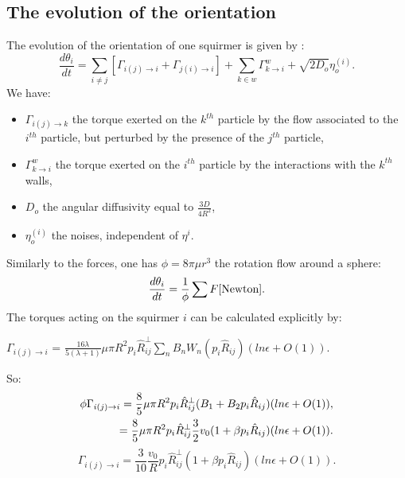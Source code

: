 \documentclass{article}
\begin{document}
\subsection{The evolution of the orientation}
The evolution of the orientation of one squirmer is given by : 
$$
\boxed{\frac{d \theta_i}{dt} = \sum\limits_{i\ne j} \left[\Gamma_{i(j)\rightarrow i} + \Gamma_{j(i)\rightarrow i}\right] + \sum\limits_{k\in w} \Gamma_{k\rightarrow i}^w + \sqrt{2D_o} \eta_o^{(i)}}.
$$
We have:
\begin{itemize}
    \item $\Gamma_{i(j)\rightarrow k}$ the torque exerted on the $k^{th}$ particle by the flow associated to the $i^{th}$ particle, but perturbed by the presence of the $j^{th}$ particle,
    \item $\Gamma_{k\rightarrow i}^w$ the torque exerted on the $i^{th}$ particle by the interactions with the $k^{th}$ walls,
    \item $D_o$ the angular diffusivity equal to $\frac{3D}{4R^2}$,
    \item $\eta_o^{(i)}$ the noises, independent of $\eta^{i}$.
\end{itemize}
\vspace{0.5cm}
Similarly to the forces, one has $\phi = 8\pi\mu r^3$ the rotation flow around a sphere\cite{Stokes}:
$$\frac{d \theta_i}{dt} = \frac{1}{\phi}\sum F\cite{Newton}.$$
The torques acting on the squirmer $i$ can be calculated explicitly by\cite{Brumley}:
\begin{center}
    $\Gamma_{i(j)\rightarrow i}$ = $\frac{16 \lambda}{5(\lambda +1)} \mu \pi R^2 p_i\hat{R}_{ij}^{\perp}\sum_{n} B_n W_n(p_i\hat{R}_{ij}) (ln \epsilon + O(1))$.   
\end{center}
So:
\begin{align*}
    \footnotesize
    \phi \Gamma_{i(j)\rightarrow i} = \frac{8}{5}\mu\pi R^2p_i\hat{R}_{ij}^{\perp}(B_1 + B_2 p_i\hat{R}_{ij})(ln \epsilon + O(1)),\\
    = \frac{8}{5}\mu\pi R^2p_i\hat{R}_{ij}^{\perp}\frac{3}{2}v_0(1 + \beta p_i\hat{R}_{ij})(ln \epsilon + O(1)).
\end{align*}
\begin{equation*}
    \boxed{\Gamma_{i(j)\rightarrow i} = \frac{3}{10}\frac{v_0}{R}p_i\hat{R}_{ij}^{\perp}(1 + \beta p_i\hat{R}_{ij})(ln \epsilon + O(1))}.
\end{equation*}
\end{document}
